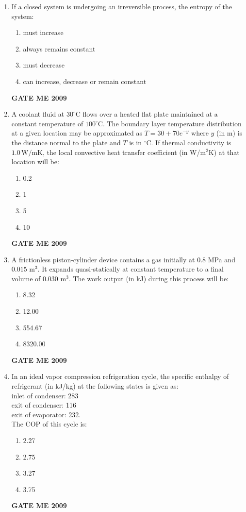 \documentclass[journal]{IEEEtran}
\begin{document}
\begin{enumerate}[leftmargin=0pt]
\item If a closed system is undergoing an irreversible process, the entropy of the system:
  \begin{enumerate}[label=(\alph*)]
    \item must increase
    \item always remains constant
    \item must decrease
    \item can increase, decrease or remain constant
  \end{enumerate}
  \hfill{\textbf{GATE ME 2009}}

\item A coolant fluid at $30^\circ$C flows over a heated flat plate maintained at a constant temperature of $100^\circ$C. The boundary layer temperature distribution at a given location may be approximated as $T = 30 + 70 e^{-y}$ where $y$ (in m) is the distance normal to the plate and $T$ is in $^\circ$C. If thermal conductivity is $1.0\,\mathrm{W/mK}$, the local convective heat transfer coefficient (in W/m$^2$K) at that location will be:
  \begin{enumerate}[label=(\alph*)]
    \item 0.2
    \item 1
    \item 5
    \item 10
  \end{enumerate}
  \hfill{\textbf{GATE ME 2009}}

\item A frictionless piston-cylinder device contains a gas initially at $0.8$ MPa and $0.015$ m$^3$. It expands quasi-statically at constant temperature to a final volume of $0.030$ m$^3$. The work output (in kJ) during this process will be:
  \begin{enumerate}[label=(\alph*)]
    \item 8.32
    \item 12.00
    \item 554.67
    \item 8320.00
  \end{enumerate}
  \hfill{\textbf{GATE ME 2009}}

\item In an ideal vapor compression refrigeration cycle, the specific enthalpy of refrigerant (in kJ/kg) at the following states is given as: \\inlet of condenser: 283 \\exit of condenser: 116\\ exit of evaporator: 232.\\ The COP of this cycle is:
  \begin{enumerate}[label=(\alph*)]
    \item 2.27
    \item 2.75
    \item 3.27
    \item 3.75
  \end{enumerate}
  \hfill{\textbf{GATE ME 2009}}


\end{enumerate}
\end{document}
